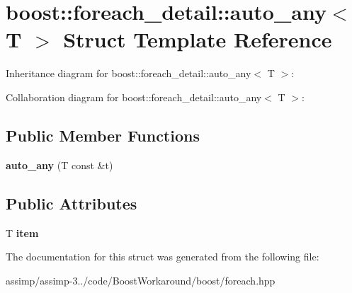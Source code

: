 \hypertarget{structboost_1_1foreach__detail_1_1auto__any}{\section{boost\+:\+:foreach\+\_\+detail\+:\+:auto\+\_\+any$<$ T $>$ Struct Template Reference}
\label{structboost_1_1foreach__detail_1_1auto__any}
}


Inheritance diagram for boost\+:\+:foreach\+\_\+detail\+:\+:auto\+\_\+any$<$ T $>$\+:


Collaboration diagram for boost\+:\+:foreach\+\_\+detail\+:\+:auto\+\_\+any$<$ T $>$\+:
\subsection*{Public Member Functions}
\begin{DoxyCompactItemize}
\item 
\hypertarget{structboost_1_1foreach__detail_1_1auto__any_ab97b29bbdca856f3f14498353269db68}{{\bfseries auto\+\_\+any} (T const \&t)}\label{structboost_1_1foreach__detail_1_1auto__any_ab97b29bbdca856f3f14498353269db68}

\end{DoxyCompactItemize}
\subsection*{Public Attributes}
\begin{DoxyCompactItemize}
\item 
\hypertarget{structboost_1_1foreach__detail_1_1auto__any_a643cb7365f237b85d6ecebc98f38fa6c}{T {\bfseries item}}\label{structboost_1_1foreach__detail_1_1auto__any_a643cb7365f237b85d6ecebc98f38fa6c}

\end{DoxyCompactItemize}


The documentation for this struct was generated from the following file\+:\begin{DoxyCompactItemize}
\item 
assimp/assimp-\/3../code/\+Boost\+Workaround/boost/foreach.\+hpp\end{DoxyCompactItemize}
